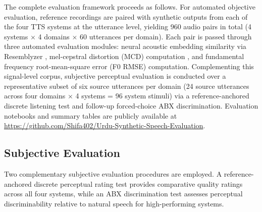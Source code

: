 \documentclass[a4paper,fleqn]{cas-dc}
\begin{document}
    The complete evaluation framework proceeds as follows. For automated objective
    evaluation, reference recordings are paired with synthetic outputs from each of the four TTS
    systems at the utterance level, yielding 960 audio pairs in total
    (4 systems $\times$ 4 domains $\times$ 60 utterances per domain).
    Each pair is passed through three automated evaluation modules: neural acoustic
    embedding similarity via Resemblyzer \citep{wan2018ge2e}, mel-cepstral distortion (MCD)
    computation \citep{kubichek1993mcd}, and fundamental frequency
    root-mean-square error (F0 RMSE) computation. Complementing this signal-level corpus,
    subjective perceptual evaluation is conducted over a representative subset of six source
    utterances per domain (24 source utterances across four domains $\times$ 4 systems = 96 system stimuli)
    via a reference-anchored discrete listening test and follow-up forced-choice ABX discrimination.
    Evaluation notebooks and summary tables are publicly available at
    \url{https://github.com/Shifa402/Urdu-Synthetic-Speech-Evaluation}.
    
    \subsection{Subjective Evaluation}\label{sec:methodology-subjective}

    Two complementary subjective evaluation procedures are employed. A reference-anchored discrete perceptual rating test provides comparative quality ratings across all four systems, while an ABX discrimination test assesses perceptual discriminability relative to natural speech for high-performing systems.
\end{document}
